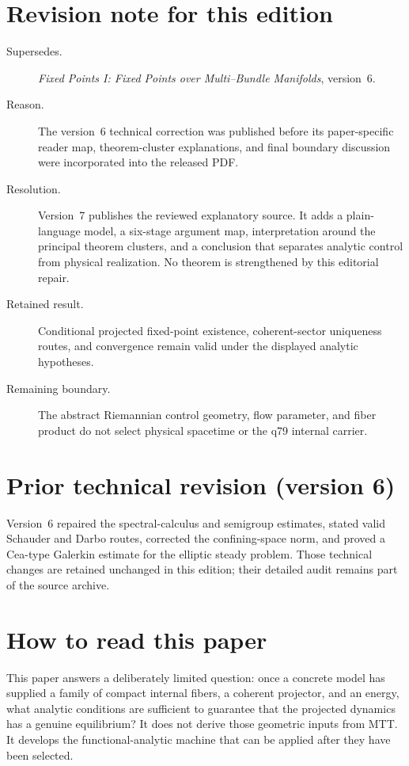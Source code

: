 \documentclass[11pt]{article}
\begin{document}
\section*{Revision note for this edition}
\begin{description}
\item[Supersedes.] \emph{Fixed Points I: Fixed Points over Multi--Bundle
Manifolds}, version~6.
\item[Reason.] The version~6 technical correction was published before its
paper-specific reader map, theorem-cluster explanations, and final boundary
discussion were incorporated into the released PDF.
\item[Resolution.] Version~7 publishes the reviewed explanatory source.  It
adds a plain-language model, a six-stage argument map, interpretation around
the principal theorem clusters, and a conclusion that separates analytic
control from physical realization.  No theorem is strengthened by this
editorial repair.
\item[Retained result.] Conditional projected fixed-point existence,
coherent-sector uniqueness routes, and convergence remain valid under the
displayed analytic hypotheses.
\item[Remaining boundary.] The abstract Riemannian control geometry, flow
parameter, and fiber product do not select physical spacetime or the q79
internal carrier.
\end{description}

\section*{Prior technical revision (version 6)}
Version~6 repaired the spectral-calculus and semigroup estimates, stated
valid Schauder and Darbo routes, corrected the confining-space norm, and
proved a Cea-type Galerkin estimate for the elliptic steady problem.  Those
technical changes are retained unchanged in this edition; their detailed
audit remains part of the source archive.

\section*{How to read this paper}
This paper answers a deliberately limited question: once a concrete model has
supplied a family of compact internal fibers, a coherent projector, and an
energy, what analytic conditions are sufficient to guarantee that the
projected dynamics has a genuine equilibrium?  It does not derive those
geometric inputs from MTT.  It develops the functional-analytic machine that
can be applied after they have been selected.
\end{document}
